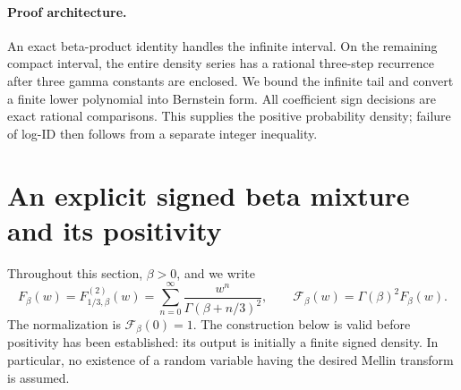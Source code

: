 \documentclass[11pt,a4paper]{article}
\numberwithin{equation}{section}
\theoremstyle{definition}\newtheorem{definition}[theorem]{Definition}
\theoremstyle{remark}\newtheorem{remark}[theorem]{Remark}
\begin{document}
\paragraph{Proof architecture.}
An exact beta-product identity handles the infinite interval. On the
remaining compact interval, the entire density series has a rational
three-step recurrence after three gamma constants are enclosed. We
bound the infinite tail and convert a finite lower polynomial into
Bernstein form. All coefficient sign decisions are exact rational
comparisons. This supplies the positive probability density; failure
of log-ID then follows from a separate integer inequality.


\section{An explicit signed beta mixture and its positivity}
\label{mix:section}

Throughout this section, \(\beta>0\), and we write
\[
 F_\beta(w)=F^{(2)}_{1/3,\beta}(w)
       =\sum_{n=0}^{\infty}\frac{w^n}{\Gamma(\beta+n/3)^2},
 \qquad
 \mathcal F_\beta(w)=\Gamma(\beta)^2F_\beta(w).
\]
The normalization is \(\mathcal F_\beta(0)=1\).  The construction
below is valid before positivity has been established: its output
is initially a finite signed density.  In particular, no existence
of a random variable having the desired Mellin transform is assumed.
\end{document}
